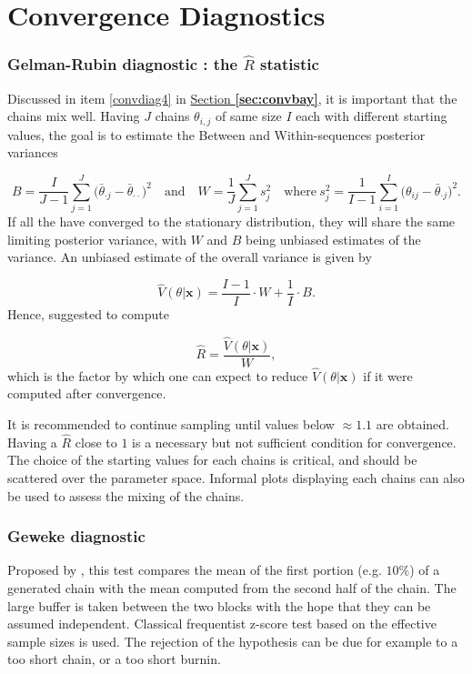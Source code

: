 \section{Convergence Diagnostics}\label{app:convdiag}


\subsubsection*{Gelman-Rubin diagnostic : the $\hat{R}$ statistic}

Discussed in item \ref{convdiag4} in \hyperref[sec:convbay]{Section \textbf{\ref{sec:convbay}}}, it is important that the chains mix well. Having $J$ chains $\theta_{i,j}$ of same size $I$ each with different starting values, the goal is to estimate the Between and Within-sequences posterior variances

\begin{equation*}
B= \frac{I}{J-1}\sum_{j=1}^J\big(\bar{\theta}_{\cdot j} - \bar{\theta}_{\cdot \cdot}\big)^2 \quad \text{and}\quad W=\frac{1}{J}\sum_{j=1}^Js^2_j \quad \text{where} \ s^2_j=\frac{1}{I-1}\sum_{i=1}^I\big(\theta_{ij}-\bar{\theta}_{\cdot j}\big)^2.
\end{equation*}
If all the have converged to the stationary distribution, they will share the same limiting posterior variance, with $W$ and $B$ being unbiased estimates of the variance. An unbiased estimate of the overall variance is given by 

\begin{equation}
\hat{V}(\theta|\boldsymbol{x})=\frac{I-1}{I}\cdot W+ \frac{1}{I}\cdot B.
\end{equation}
Hence, \citet{gelman1992} suggested to compute 

\begin{equation}\label{eq:rhat}
\hat{R}=\frac{\hat{V}(\theta|\boldsymbol{x})}{W},
\end{equation}
which is the factor by which one can expect to reduce $\hat{V}(\theta|\boldsymbol{x})$ if it were computed after convergence. 

It is recommended to continue sampling until values below $\approx 1.1$ are obtained. Having a $\hat{R}$ close to $1$ is a necessary but not sufficient condition for convergence. The choice of the starting values for each chains is critical, and should be scattered over the parameter space. Informal plots displaying each chains can also be used to assess the mixing of the chains.


\subsubsection*{Geweke diagnostic}
Proposed by \citet{Geweke92}, this test compares the mean of the first portion (e.g. $10\%$) of a generated chain with the mean computed from the second half of the chain. The large buffer is taken between the two blocks with the hope that they can be assumed independent. Classical frequentist z-score test based on the effective sample sizes is used. 
The rejection of the hypothesis can be due for example to a too short chain, or a too short burnin.

